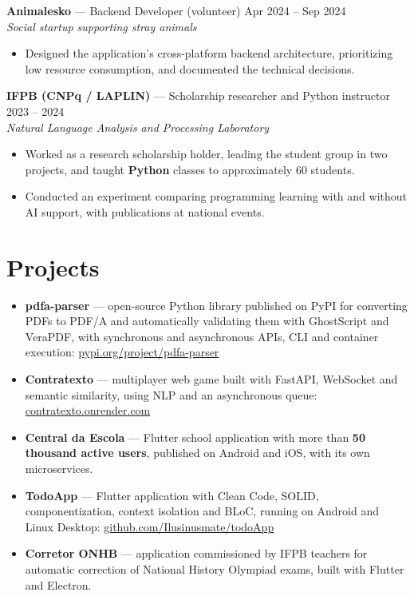 \documentclass[10.5pt,a4paper]{article}
\newcommand{\cargo}[4]{%
  \Needspace*{5\baselineskip}%
  \textbf{#1} \textnormal{---} #2 \hfill \textnormal{#3}\\
  \textit{\small #4}\vspace{0.4ex}
}
\begin{document}
\cargo{Animalesko}{Backend Developer (volunteer)}{Apr 2024 -- Sep 2024}{Social startup supporting
stray animals}
\begin{itemize}
  \item Designed the application's cross-platform backend architecture, prioritizing low resource
        consumption, and documented the technical decisions.
\end{itemize}

\cargo{IFPB (CNPq / LAPLIN)}{Scholarship researcher and Python instructor}{2023 -- 2024}{Natural
Language Analysis and Processing Laboratory}
\begin{itemize}
  \item Worked as a research scholarship holder, leading the student group in two projects, and
        taught \textbf{Python} classes to approximately 60 students.
  \item Conducted an experiment comparing programming learning with and without AI support, with
        publications at national events.
\end{itemize}

\section*{Projects}
\begin{itemize}
  \item \textbf{pdfa-parser} --- open-source Python library published on PyPI for converting PDFs to
        PDF/A and automatically validating them with GhostScript and VeraPDF, with synchronous and
        asynchronous APIs, CLI and container execution:
        \href{https://pypi.org/project/pdfa-parser}{pypi.org/project/pdfa-parser}
  \item \textbf{Contratexto} --- multiplayer web game built with FastAPI, WebSocket and semantic
        similarity, using NLP and an asynchronous queue:
        \href{https://contratexto.onrender.com}{contratexto.onrender.com}
  \item \textbf{Central da Escola} --- Flutter school application with more than
        \textbf{50 thousand active users}, published on Android and iOS, with its own microservices.
  \item \textbf{TodoApp} --- Flutter application with Clean Code, SOLID, componentization, context
        isolation and BLoC, running on Android and Linux Desktop:
        \href{https://github.com/Ilusinusmate/todoApp}{github.com/Ilusinusmate/todoApp}
  \item \textbf{Corretor ONHB} --- application commissioned by IFPB teachers for automatic correction
        of National History Olympiad exams, built with Flutter and Electron.
\end{itemize}
\end{document}
